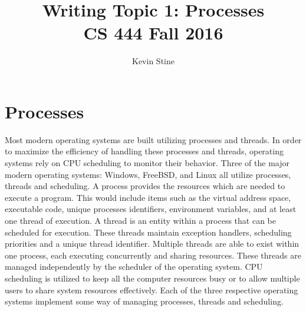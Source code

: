 \documentclass[letterpaper,10pt,draftclsnofoot,onecolumn,titlepage]{IEEEtran}
\def\name{Kevin Stine}
\begin{document}
	\title{\huge Writing Topic 1: Processes\\CS 444 Fall 2016}
	\author{\large \name}
	\maketitle
	\newpage
	\section*{Processes}
		Most modern operating systems are built utilizing processes and threads.
		In order to maximize the efficiency of handling these processes and threads, operating systems rely on CPU scheduling to monitor their behavior.
		Three of the major modern operating systems: Windows, FreeBSD, and Linux all utilize processes, threads and scheduling.
		A process provides the resources which are needed to execute a program.
		This would include items such as the virtual address space, executable code, unique processes identifiers, environment variables, and at least one thread of execution.
		A thread is an entity within a process that can be scheduled for execution. These threads maintain exception handlers, scheduling priorities and a unique thread identifier. Multiple threads are able to exist within one process, each executing concurrently and sharing resources.
		These threads are managed independently by the scheduler of the operating system.
		CPU scheduling is utilized to keep all the computer resources busy or to allow multiple users to share system resources effectively.
		Each of the three respective operating systems implement some way of managing processes, threads and scheduling.
\end{document}
